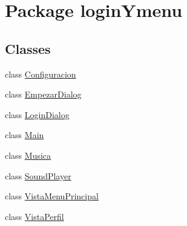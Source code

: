 \hypertarget{namespacelogin_ymenu}{}\section{Package login\+Ymenu}
\label{namespacelogin_ymenu}
\subsection*{Classes}
\begin{DoxyCompactItemize}
\item 
class \mbox{\hyperlink{classlogin_ymenu_1_1_configuracion}{Configuracion}}
\item 
class \mbox{\hyperlink{classlogin_ymenu_1_1_empezar_dialog}{Empezar\+Dialog}}
\item 
class \mbox{\hyperlink{classlogin_ymenu_1_1_login_dialog}{Login\+Dialog}}
\item 
class \mbox{\hyperlink{classlogin_ymenu_1_1_main}{Main}}
\item 
class \mbox{\hyperlink{classlogin_ymenu_1_1_musica}{Musica}}
\item 
class \mbox{\hyperlink{classlogin_ymenu_1_1_sound_player}{Sound\+Player}}
\item 
class \mbox{\hyperlink{classlogin_ymenu_1_1_vista_menu_principal}{Vista\+Menu\+Principal}}
\item 
class \mbox{\hyperlink{classlogin_ymenu_1_1_vista_perfil}{Vista\+Perfil}}
\end{DoxyCompactItemize}
